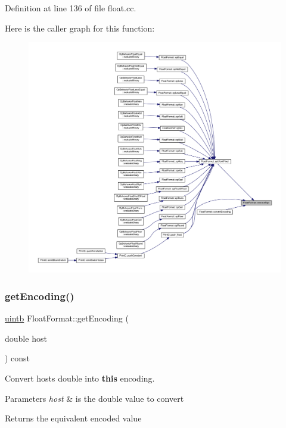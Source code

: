 Definition at line 136 of file float.\+cc.

Here is the caller graph for this function\+:
\nopagebreak
\begin{figure}[H]
\begin{center}
\leavevmode
\includegraphics[width=350pt]{class_float_format_afa7d38ddb73a8cd9f4d29b839af04d1d_icgraph}
\end{center}
\end{figure}
\mbox{\label{class_float_format_a6f8450c4637e1e2c098b6b1c38f6061f}} 
\subsubsection{\texorpdfstring{getEncoding()}{getEncoding()}}
{\footnotesize\ttfamily \mbox{\hyperlink{types_8h_a2db313c5d32a12b01d26ac9b3bca178f}{uintb}} Float\+Format\+::get\+Encoding (\begin{DoxyParamCaption}\item[{double}]{host }\end{DoxyParamCaption}) const}



Convert host\textquotesingle{}s double into {\bfseries{this}} encoding. 


\begin{DoxyParams}{Parameters}
{\em host} & is the double value to convert \\
\hline
\end{DoxyParams}
\begin{DoxyReturn}{Returns}
the equivalent encoded value 
\end{DoxyReturn}



